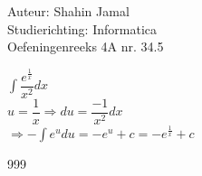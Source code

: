 \documentclass[a4paper]{article}
\begin{document}
  
\noindent \large Auteur: Shahin Jamal \\
\noindent \large Studierichting: Informatica\\
\noindent \large Oefeningenreeks 4A nr. 34.5\\

\medskip

\normalsize

$\displaystyle\int\dfrac{e^{\tfrac{1}{x}}}{x^2}dx$\\

$u = \dfrac{1}{x} \Rightarrow du = \dfrac{-1}{x^2}dx$\\

$\Rightarrow-\displaystyle\int e^u du = - e^u + c = -e^{\tfrac{1}{x}} + c$\\

\begin{thebibliography}{999}
\end{thebibliography}
\end{document}
